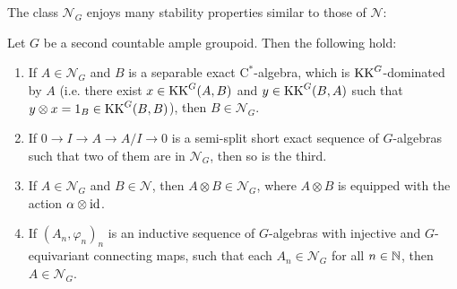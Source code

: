 	The class $\mathcal{N}_G$ enjoys many stability properties similar to those of $\mathcal{N}$:
	\begin{lemma}\label{Lemma:Stability Properties of N_G}
		Let $G$ be a second countable ample groupoid. Then the following hold:
		\begin{enumerate}
			\item If $A\in\mathcal{N}_G$ and $B$ is a separable exact $\mathrm{C}^*$-algebra, which is $\mathrm{KK}^G$-dominated by $A$ (i.e. there exist $x\in\mathrm{KK}^G(A,B)$ and $y\in \mathrm{KK}^G(B,A)$ such that $y\otimes x=1_B\in \mathrm{KK}^G(B,B)$), then $B\in\mathcal{N}_G$.
			\item If $0\rightarrow I\rightarrow A\rightarrow A/I\rightarrow 0$ is a semi-split short exact sequence of $G$-algebras such that two of them are in $\mathcal{N}_G$, then so is the third.
			\item If $A\in\mathcal{N}_G$ and $B\in\mathcal{N}$, then $A\otimes B\in\mathcal{N}_G$, where $A\otimes B$ is equipped with the action $\alpha\otimes\text{id}$.
			\item If $(A_n,\varphi_n)_n$ is an inductive sequence of $G$-algebras with injective and $G$-equivariant connecting maps, such that each $A_n\in\mathcal{N}_G$ for all $n\in\mathbb N$, then $A\in\mathcal{N}_G$.
		\end{enumerate}
	\end{lemma}
